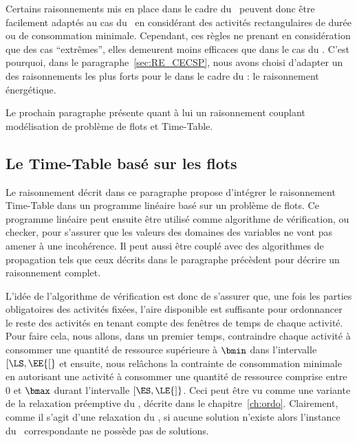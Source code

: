 Certains raisonnements mis en place dans le cadre du \CUSP~peuvent
donc être facilement adaptés au cas du \CECSP~en considérant des
activités rectangulaires de durée ou de consommation
minimale. Cependant, ces règles ne prenant en considération que des
cas ``extrêmes'', elles demeurent moins efficaces que dans le cas du
\CUSP. C'est pourquoi, dans le paragraphe~\ref{sec:RE_CECSP}, nous
avons choisi d'adapter un des raisonnements les plus forts pour le
\CUSP dans le cadre du \CECSP: le raisonnement énergétique.

Le prochain paragraphe présente quant à lui un raisonnement couplant
modélisation de problème de flots et Time-Table. 

\subsection{Le Time-Table basé sur les flots}

Le raisonnement décrit dans ce paragraphe propose d'intégrer le
raisonnement Time-Table dans un programme linéaire basé sur un
problème de flots. Ce programme linéaire peut ensuite être utilisé
comme algorithme de vérification, ou checker, pour s'assurer que les
valeurs des domaines des variables ne vont pas amener à une
incohérence. Il peut aussi être couplé avec des algorithmes de
propagation tels que ceux décrits dans le paragraphe précèdent pour
décrire un raisonnement complet. 

L'idée de l'algorithme de vérification est donc de s'assurer que, une
fois les parties obligatoires des activités fixées, l'aire disponible
est suffisante pour ordonnancer le reste des activités en tenant
compte des fenêtres de temps de chaque activité. Pour faire cela, nous
allons, dans un premier temps, contraindre chaque activité à consommer
une quantité de ressource supérieure à $\bmin$ dans l'intervalle
$[\LS,\EE{[}$ et ensuite, nous relâchons la contrainte de consommation
minimale en autorisant une activité à consommer une quantité de
ressource comprise entre $0$ et $\bmax$ durant l'intervalle
$[\ES,\LE{]}$. Ceci peut être vu comme une variante de la relaxation
préemptive du \CECSP, décrite dans le chapitre~\ref{ch:ordo}. 
Clairement, comme il s'agit d'une relaxation du \CECSP, si aucune
solution n'existe alors l'instance du \CECSP~correspondante
ne possède pas de solutions. 

